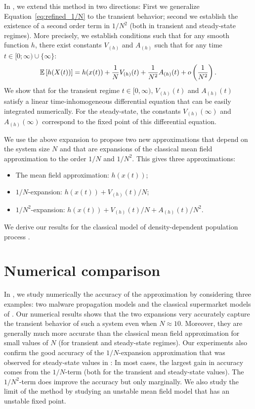 \documentclass{sig-alternate-per-Performance2018}
\newcommand\esp[1]{{\mathchoice{\besp{#1}}{\sesp{#1}}{\sesp{#1}}{\sesp{#1}}}}
\newcommand\besp[1]{\mathbb{E}\left[#1\right]}
\newcommand\sesp[1]{\mathbb{E}[#1]}
\newcommand\p[1]{\left(#1\right)}
\begin{document}
In \cite{githubPaper2018}, we extend this method in two directions:
First we generalize Equation~\eqref{eq:refined_1/N} to the transient
behavior; second we establish the existence of a second order term in
$1/N^2$ (both in transient and steady-state regimes). More precisely,
we establish conditions such that for any smooth function $h$, there
exist constants $V_{(h)}$ and $A_{(h)}$ such that for any time
$t\in[0;\infty)\cup\{\infty\}$:
\begin{align*}
  \esp{h(X(t))} = h(x(t)) + \frac1N V_{(h)}(t) + \frac1{N^2} A_{(h)}(t) +
  o\p{\frac1{N^2}}.  
\end{align*}
We show that for the transient regime $t\in[0,\infty)$, $V_{(h)}(t)$
and $A_{(h)}(t)$ satisfy a linear time-inhomogeneous differential
equation that can be easily integrated numerically. For the
steady-state, the constants $V_{(h)}(\infty)$ and $A_{(h)}(\infty)$
correspond to the fixed point of this differential equation.

We use the above expansion to propose two new approximations that
depend on the system size $N$ and that are expansions of the classical
mean field approximation to the order $1/N$ and $1/N^2$. This gives
three approximations:
\begin{itemize}
\item The mean field approximation: $h(x(t))$;
\item $1/N$-expansion: $h(x(t))+V_{(h)}(t)/N$;
\item $1/N^2$-expansion: $h(x(t))+V_{(h)}(t)/N+A_{(h)}(t)/N^2$.
\end{itemize}

We derive our results for the classical model of density-dependent
population process \cite{kurtz70}.

\section{Numerical comparison}

In \cite{githubPaper2018}, we study numerically the accuracy of the
approximation by considering three examples: two malware propagation
models and the classical supermarket models of
\cite{mitzenmacher1996power,vvedenskaya1996queueing}. Our numerical
results shows that the two expansions very accurately capture the
transient behavior of such a system even when $N\approx10$. Moreover,
they are generally much more accurate than the classical mean field
approximation for small values of $N$ (for transient and steady-state
regimes).  Our experiments also confirm the good accuracy of the
$1/N$-expansion approximation that was observed for steady-state
values in \cite{gast2017refined}: In most cases, the largest gain in
accuracy comes from the $1/N$-term (both for the transient and
steady-state values).  The $1/N^2$-term does improve the accuracy but
only marginally.  We also study the limit of the method by studying an
unstable mean field model that has an unstable fixed point.
\end{document}
